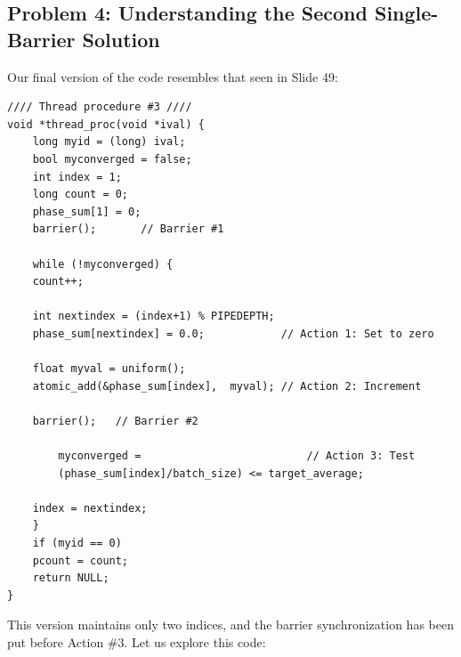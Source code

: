 \documentclass[11pt]{article}
\begin{document}
\subsection*{Problem 4: Understanding the Second Single-Barrier Solution}
Our final version of the code resembles that seen in Slide 49:
\begin{lstlisting}
//// Thread procedure #3 ////
void *thread_proc(void *ival) {
    long myid = (long) ival;
    bool myconverged = false;
    int index = 1;
    long count = 0;
    phase_sum[1] = 0;
    barrier();       // Barrier #1

    while (!myconverged) {
	count++;

	int nextindex = (index+1) % PIPEDEPTH;
	phase_sum[nextindex] = 0.0;            // Action 1: Set to zero

	float myval = uniform();
	atomic_add(&phase_sum[index],  myval); // Action 2: Increment

	barrier();   // Barrier #2

        myconverged =                          // Action 3: Test
	    (phase_sum[index]/batch_size) <= target_average;

	index = nextindex;
    }
    if (myid == 0)
	pcount = count;
    return NULL;
}
\end{lstlisting}
\newpage
This version  maintains only two indices, and the
barrier synchronization has been put before Action \#3.  Let us explore this code:
\end{document}
